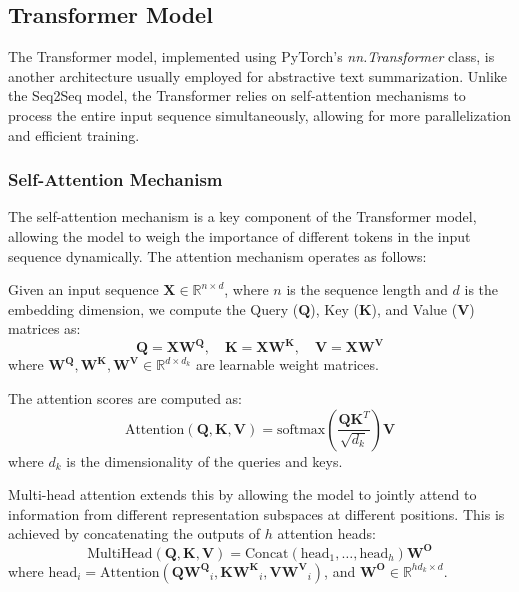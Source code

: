 \subsection{Transformer Model}

The Transformer model\cite{vaswani2017attention}, implemented using PyTorch's \textit{nn.Transformer} class\cite{transformer}, is another architecture usually employed for abstractive text summarization. Unlike the Seq2Seq model, the Transformer relies on self-attention mechanisms to process the entire input sequence simultaneously, allowing for more parallelization and efficient training.

\subsubsection{Self-Attention Mechanism}

The self-attention mechanism is a key component of the Transformer model, allowing the model to weigh the importance of different tokens in the input sequence dynamically. The attention mechanism operates as follows:

Given an input sequence \(\mathbf{X} \in \mathbb{R}^{n \times d}\), where \(n\) is the sequence length and \(d\) is the embedding dimension, we compute the Query (\(\mathbf{Q}\)), Key (\(\mathbf{K}\)), and Value (\(\mathbf{V}\)) matrices as:
\begin{equation}
     \mathbf{Q} = \mathbf{X}\mathbf{W^Q}, \quad \mathbf{K} = \mathbf{XW^K}, \quad \mathbf{V} = \mathbf{XW^V}
\end{equation}
where \(\mathbf{W^Q}, \mathbf{W^K}, \mathbf{W^V} \in \mathbb{R}^{d \times d_k}\) are learnable weight matrices.

The attention scores are computed as:
\begin{equation}
    \text{Attention}(\mathbf{Q}, \mathbf{K}, \mathbf{V}) = \text{softmax}\left(\frac{\mathbf{Q}\mathbf{K}^T}{\sqrt{d_k}}\right)\mathbf{V}
\end{equation}
where \(d_k\) is the dimensionality of the queries and keys.

Multi-head attention extends this by allowing the model to jointly attend to information from different representation subspaces at different positions. This is achieved by concatenating the outputs of \(h\) attention heads:
\begin{equation}
    \text{MultiHead}(\mathbf{Q}, \mathbf{K}, \mathbf{V}) = \text{Concat}(\text{head}_1, \ldots, \text{head}_h)\mathbf{W^O}
\end{equation}
where \(\text{head}_i = \text{Attention}(\mathbf{Q}\mathbf{W^Q}_i, \mathbf{K}\mathbf{W^K}_i, \mathbf{V}\mathbf{W^V}_i)\), and \(\mathbf{W^O} \in \mathbb{R}^{hd_k \times d}\).


